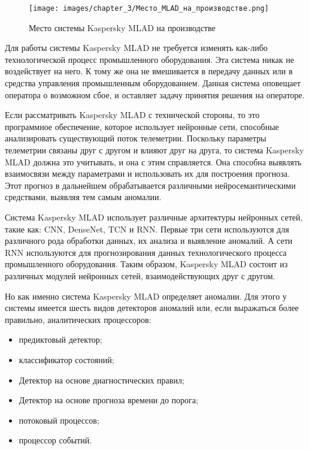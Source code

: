 \begin{figure}[H]
    \centering
    \texttt{[image: images/chapter\_3/Место\_MLAD\_на\_производстве.png]}
    \caption{Место системы Kaspersky MLAD на производстве}
    \label{fig:MLAD}
\end{figure}

Для работы системы Kaspersky MLAD не требуется изменять как-либо технологической процесс промышленного оборудования. Эта система никак не воздействует на него. К тому же она не вмешивается в передачу данных или в средства управления промышленным оборудованием. Данная система оповещает оператора о возможном сбое, и оставляет задачу принятия решения на операторе.

Если рассматривать Kaspersky MLAD с технической стороны, то это программное обеспечение, которое использует нейронные сети, способные анализировать существующий поток телеметрии. Поскольку параметры телеметрии связаны друг с другом и влияют друг на друга, то система Kaspersky MLAD должна это учитывать, и она с этим справляется. Она способна выявлять взаимосвязи между параметрами и использовать их для построения прогноза. Этот прогноз в дальнейшем обрабатывается различными нейросемантическими средствами, выявляя тем самым аномалии.

Система Kaspersky MLAD использует различные архитектуры нейронных сетей, такие как: CNN, DenseNet, TCN и RNN. Первые три сети используются для различного рода обработки данных, их анализа и выявление аномалий. А сети RNN используются для прогнозирования данных технологического процесса промышленного оборудования. Таким образом, Kaspersky MLAD состоит из различных модулей нейронных сетей, взаимодействующих друг с другом.

Но как именно система Kaspersky MLAD определяет аномалии. Для этого у системы имеется шесть видов детекторов аномалий или, если выражаться более правильно, аналитических процессоров:

\begin{itemize}
    \item предиктовый детектор;
    \item классификатор состояний;
    \item Детектор на основе диагностических правил;
    \item Детектор на основе прогноза времени до порога;
    \item потоковый процессов;
    \item процессор событий.
\end{itemize}

